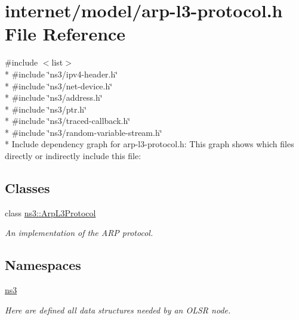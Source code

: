 \hypertarget{arp-l3-protocol_8h}{}\section{internet/model/arp-\/l3-\/protocol.h File Reference}
\label{arp-l3-protocol_8h}
{\ttfamily \#include $<$list$>$}\\*
{\ttfamily \#include \char`\"{}ns3/ipv4-\/header.\+h\char`\"{}}\\*
{\ttfamily \#include \char`\"{}ns3/net-\/device.\+h\char`\"{}}\\*
{\ttfamily \#include \char`\"{}ns3/address.\+h\char`\"{}}\\*
{\ttfamily \#include \char`\"{}ns3/ptr.\+h\char`\"{}}\\*
{\ttfamily \#include \char`\"{}ns3/traced-\/callback.\+h\char`\"{}}\\*
{\ttfamily \#include \char`\"{}ns3/random-\/variable-\/stream.\+h\char`\"{}}\\*
Include dependency graph for arp-\/l3-\/protocol.h\+:
This graph shows which files directly or indirectly include this file\+:
\subsection*{Classes}
\begin{DoxyCompactItemize}
\item 
class \hyperlink{classns3_1_1ArpL3Protocol}{ns3\+::\+Arp\+L3\+Protocol}
\begin{DoxyCompactList}\small\item\em An implementation of the A\+RP protocol. \end{DoxyCompactList}\end{DoxyCompactItemize}
\subsection*{Namespaces}
\begin{DoxyCompactItemize}
\item 
 \hyperlink{namespacens3}{ns3}
\begin{DoxyCompactList}\small\item\em Here are defined all data structures needed by an O\+L\+SR node. \end{DoxyCompactList}\end{DoxyCompactItemize}

